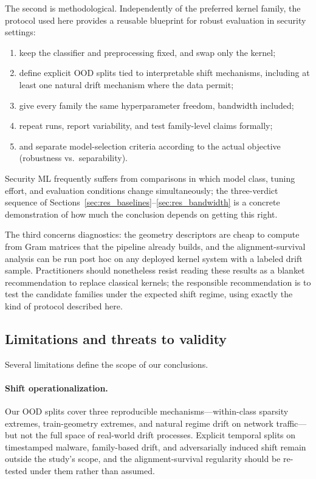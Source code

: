 \documentclass[journal]{IEEEtran}
\begin{document}
The second is methodological. Independently of the preferred kernel family, the protocol used here provides a reusable blueprint for robust evaluation in security settings:
\begin{enumerate}
    \item keep the classifier and preprocessing fixed, and swap only the kernel;
    \item define explicit OOD splits tied to interpretable shift mechanisms, including at least one natural drift mechanism where the data permit;
    \item give every family the same hyperparameter freedom, bandwidth included;
    \item repeat runs, report variability, and test family-level claims formally;
    \item and separate model-selection criteria according to the actual objective (robustness vs.\ separability).
\end{enumerate}
Security ML frequently suffers from comparisons in which model class, tuning effort, and evaluation conditions change simultaneously; the three-verdict sequence of Sections~\ref{sec:res_baselines}--\ref{sec:res_bandwidth} is a concrete demonstration of how much the conclusion depends on getting this right.

The third concerns diagnostics: the geometry descriptors are cheap to compute from Gram matrices that the pipeline already builds, and the alignment-survival analysis can be run post hoc on any deployed kernel system with a labeled drift sample. Practitioners should nonetheless resist reading these results as a blanket recommendation to replace classical kernels; the responsible recommendation is to test the candidate families under the expected shift regime, using exactly the kind of protocol described here.

\subsection{Limitations and threats to validity}

Several limitations define the scope of our conclusions.

\paragraph{Shift operationalization.}
Our OOD splits cover three reproducible mechanisms---within-class sparsity extremes, train-geometry extremes, and natural regime drift on network traffic---but not the full space of real-world drift processes. Explicit temporal splits on timestamped malware, family-based drift, and adversarially induced shift remain outside the study's scope, and the alignment-survival regularity should be re-tested under them rather than assumed.
\end{document}
